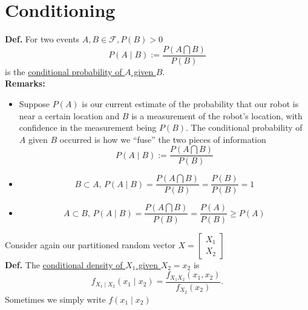 \documentclass[letterpaper]{article}
\begin{document}
 \vspace*{2cm}

        \section{Conditioning}

        \noindent
        \textbf{Def.} For two events $A,B \in \mathscr{F}, P(B) > 0$
        $$P(A \mid B):=\frac{P(A\bigcap B)}{P(B)}$$
        is the \ul{conditional probability of $A$ given $B$}. \\

        \textbf{Remarks:}
        \begin{itemize}
        \item Suppose $P(A)$ is our current estimate of the probability that our robot is near a certain location and $B$ is a measurement of the robot's location, with confidence in the measurement being $P(B)$. The conditional probability of $A$ given $B$ occurred is how we ``fuse'' the two pieces of information
        $$P(A \mid B):=\frac{P(A\bigcap B)}{P(B)}$$

        \item
        $$B\subset A \mbox{, } P(A \mid B)=\frac{P(A\bigcap B)}{P(B)}=\frac{P(B)}{P(B)}=1$$
        \item
        $$A\subset B \mbox{, } P(A \mid B)=\frac{P(A\bigcap B)}{P(B)}=\frac{P(A)}{P(B)}\ge P(A)$$

        \end{itemize}

\newpage
Consider again our partitioned random vector $ X = \left[ \begin{array}{cc} X_1 \\
                                               X_2 \end{array} \right]$\\

          \textbf{Def.} The \ul{conditional density of $X_1$ given $X_2 = x_2$} is
          $$f_{X_1\mid X_2}(x_1 \mid x_2)=\frac{f_{X_1X_2}(x_1,x_2)}{f_{X_2}(x_2)}.$$
        Sometimes we simply write $f(x_1 \mid x_2)$\\
\end{document}
